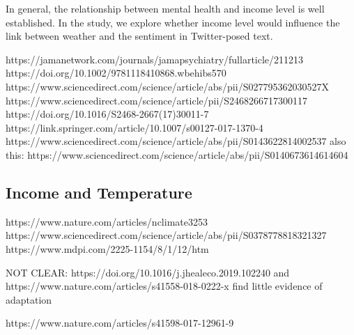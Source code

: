 \documentclass{article}
\begin{document}
In general, the relationship between mental health and income level is well established. In the study, we explore whether income level would influence the link between weather and the sentiment in Twitter-posed text.

https://jamanetwork.com/journals/jamapsychiatry/fullarticle/211213
https://doi.org/10.1002/9781118410868.wbehibs570
https://www.sciencedirect.com/science/article/abs/pii/S027795362030527X
https://www.sciencedirect.com/science/article/pii/S2468266717300117
https://doi.org/10.1016/S2468-2667(17)30011-7
https://link.springer.com/article/10.1007/s00127-017-1370-4
https://www.sciencedirect.com/science/article/abs/pii/S0143622814002537
also this: https://www.sciencedirect.com/science/article/abs/pii/S0140673614614604

\subsection{Income and Temperature}
https://www.nature.com/articles/nclimate3253
https://www.sciencedirect.com/science/article/abs/pii/S0378778818321327
https://www.mdpi.com/2225-1154/8/1/12/htm

NOT CLEAR: https://doi.org/10.1016/j.jhealeco.2019.102240 and https://www.nature.com/articles/s41558-018-0222-x find little evidence of adaptation



https://www.nature.com/articles/s41598-017-12961-9

\end{document}
